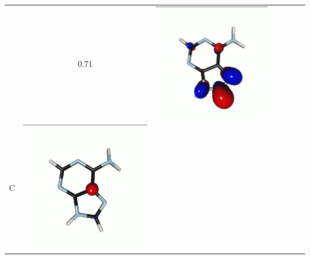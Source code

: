 \documentclass[journal=jctcce,manuscript=article]{achemso}
\begin{document}
\begin{table}[H]
\begin{tabular}{ l| c c c | c c c }
\begin{minipage}{0.2\textwidth}
    \end{minipage}
    & 0.71
    & 
    \begin{minipage}{0.2\textwidth}
        \centering
        \includegraphics[scale=0.10]{NTO/Adenine_C/2p_Cs.png}
    \end{minipage}
    \\
            C &  
    \begin{minipage}{0.2\textwidth}
        \centering
        \includegraphics[scale=0.10]{NTO/Adenine_C/3h_C1.png}

\end{minipage}
\end{tabular}
\end{table}
\end{document}
